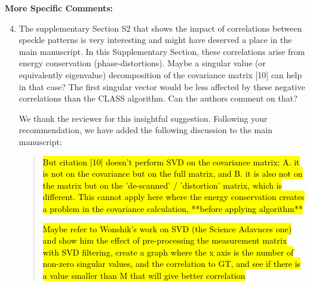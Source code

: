 \documentclass[12pt]{article}
\newcommand{\hlred}[1]{\sethlcolor{red!30}\hl{#1}}
\newenvironment{reviewercomment}
    {\begin{tcolorbox}[width=\linewidth,colback=gray!5,colframe=commentcolor!50,title=Reviewer Comment,left=5pt,right=5pt]}
    {\end{tcolorbox}}
\newenvironment{ourresponse}
    {\begin{tcolorbox}[width=\linewidth,breakable,enhanced,colback=gray!5,colframe=responsecolor!50,title=Response,left=5pt,right=5pt]}
    {\end{tcolorbox}}
\begin{document}
\textbf{More Specific Comments:}
\begin{enumerate}[label=\arabic*.]
    \setcounter{enumi}{3}
    \item  \leavevmode\vspace{-\baselineskip}
    \begin{reviewercomment}
        The supplementary Section S2 that shows the impact of correlations between speckle patterns is very interesting and might have deserved a place in the main manuscript. In this Supplementary Section, these correlations arise from energy conservation (phase-distortions). Maybe a singular value (or equivalently eigenvalue) decomposition of the covariance matrix [10] can help in that case? The first singular vector would be less affected by these negative correlations than the CLASS algorithm. Can the authors comment on that? 
    \end{reviewercomment}
    \begin{ourresponse}

        We thank the reviewer for this insightful suggestion. Following your recommendation, we have added the following discussion to the main manuscript:
        
        \begin{quote}
        \hlred{But citation [10] doesn't perform SVD on the covariance matrix: A. it is not on the covariance but on the full matrix, and B. it is also not on the matrix but on the 'de-scanned' / 'distortion' matrix, which is different. This cannot apply here where the energy conservation creates a problem in the covariance calculation, **before applying algorithm**}
    


        \hlred{Maybe refer to Wonshik's work on SVD (the Science Adavnces one) and show him the effect of pre-processing the measurement matrix with SVD filtering, create a graph where the x axis is the number of non-zero singular values, and the correlation to GT, and see if there is a value smaller than M that will give better correlation}


\end{quote}
\end{ourresponse}
\end{enumerate}
\end{document}

